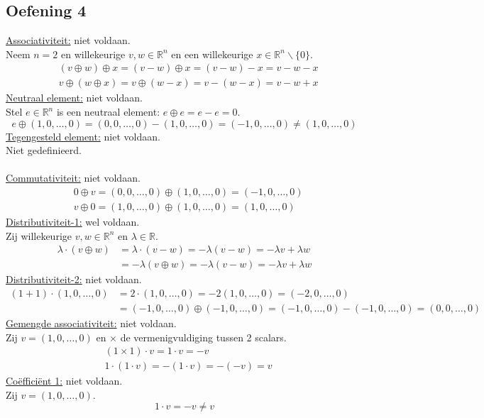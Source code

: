 \documentclass[lineaire_algebra_oplossingen.tex]{subfiles}
\begin{document}
\subsection{Oefening 4}%
\underline{Associativiteit:} niet voldaan.\\
Neem $n=2$ en willekeurige $v,w \in \mathbb{R}^n$ en een willekeurige $x \in \mathbb{R}^n\backslash\{0\}$.
\begin{align*}
& (v \oplus w) \oplus x = (v-w) \oplus x = (v - w) - x = v - w - x \\
& v \oplus (w \oplus x) = v \oplus (w-x) = v - (w-x) = v - w + x
\end{align*}
\underline{Neutraal element:} niet voldaan.\\
Stel $e \in \mathbb{R}^n$ is een neutraal element: $e \oplus e = e-e = 0$.
\[
e \oplus (1,0,\ldots,0)
= (0,0,\ldots,0) - (1,0,\ldots,0) = (-1,0,\ldots,0)
\neq (1,0,\ldots,0)
\]
\underline{Tegengesteld element:} niet voldaan.\\
Niet gedefinieerd.\\\\
\underline{Commutativiteit:} niet voldaan.
\begin{align*}
&0 \oplus v
= (0,0,\ldots,0) \oplus (1,0,\ldots,0) = (-1,0,\ldots,0) \\
&v \oplus 0
= (1,0,\ldots,0) \oplus (1,0,\ldots,0) = (1,0,\ldots,0)
\end{align*}
\underline{Distributiviteit-1:} wel voldaan.\\
Zij willekeurige $v,w \in \mathbb{R}^n$ en $\lambda \in \mathbb{R}$.
\begin{align*}
\lambda \cdot (v \oplus w)
&= \lambda \cdot (v-w) = -\lambda(v-w) = -\lambda v + \lambda w \\
&= -\lambda(v \oplus w) = -\lambda(v-w) = -\lambda v + \lambda w
\end{align*}
\underline{Distributiviteit-2:} niet voldaan.
\begin{align*}
(1+1) \cdot (1,0,\ldots,0)
&= 2 \cdot (1,0,\ldots,0) = -2 (1,0,\ldots,0) = (-2,0,\ldots,0) \\
&= (-1,0,\ldots,0) \oplus (-1,0,\ldots,0) = (-1,0,\ldots,0) - (-1,0,\ldots,0) = (0,0,\ldots,0)
\end{align*}
\underline{Gemengde associativiteit:} niet voldaan.\\
Zij $v = (1,0,\ldots,0)$ en $\times$ de vermenigvuldiging tussen 2 scalars.
\begin{align*}
&(1 \times 1) \cdot v = 1 \cdot v = -v \\
&1 \cdot (1 \cdot v) = - (1 \cdot v) = -(-v) = v
\end{align*}
\underline{Co\"effici\"ent 1:} niet voldaan.\\
Zij $v = (1,0,\ldots,0)$.
\[
1 \cdot v = -v \neq v
\]
\end{document}
